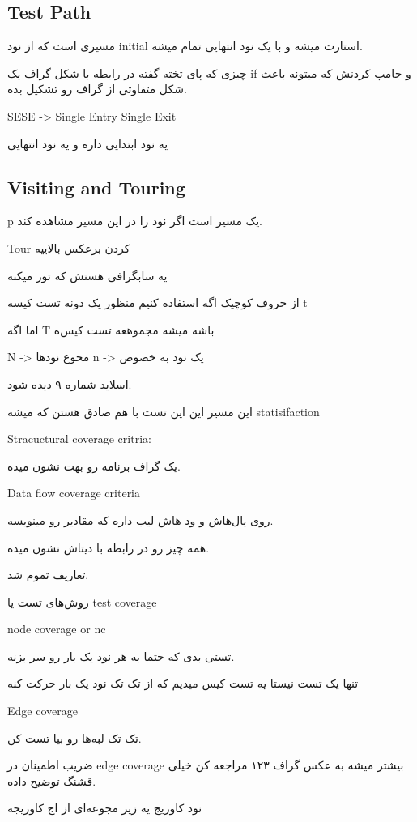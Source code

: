 \subsection{Test Path}

مسیری است که از نود initial استارت میشه و با یک نود انتهایی تمام میشه.

چیزی که پای تخته گفته در رابطه با شکل گراف یک if و جامپ کردنش که میتونه باعث شکل
متفاوتی از گراف رو تشکیل بده.

SESE -> Single Entry Single Exit

یه نود ابتدایی داره و یه نود انتهایی

\subsection{Visiting and Touring}

p یک مسیر است اگر نود  را در این مسیر مشاهده کند.

Tour کردن برعکس بالاییه

یه سابگرافی هستش که تور میکنه

از حروف کوچیک اگه استفاده کنیم منظور یک دونه تست کیسه t

اما اگه T باشه میشه مجموهعه تست کیس‌ه

N -> محوع نود‌ها
n -> یک نود به خصوص

اسلاید شماره ۹ دیده شود.

این مسیر این این تست با هم صادق هستن که میشه statisifaction

Stracuctural coverage critria: 

یک گراف برنامه رو بهت نشون میده.

Data flow coverage criteria

روی یال‌هاش و ود هاش لیب داره که مقادیر رو مینویسه.

همه چیز رو در رابطه با دیتاش نشون میده.

تعاریف تموم شد.

روش‌های تست یا test coverage

node coverage or nc

تستی بدی که حتما به هر نود یک بار رو سر بزنه.

تنها یک تست نیستا یه تست کیس میدیم که از تک تک نود یک بار حرکت کنه

Edge coverage

تک تک لبه‌ها رو بیا تست کن.

ضریب اطمینان در edge coverage بیشتر میشه
به عکس گراف ۱۲۳ مراجعه کن خیلی قشنگ توضیح داده.

نود کاوریج یه زیر مجوعه‌ای از اج کاوریجه

